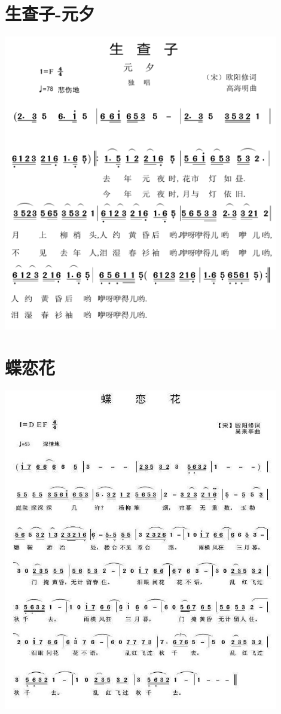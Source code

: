 \documentclass[cn,pad,twocol]{elegantbook}
\begin{document}
\section{生查子-元夕} \includegraphics[width=0.9\textwidth]{rpi400/20210212欧阳修-生查子元夕.png}
\section{蝶恋花} \includegraphics[width=0.9\textwidth]{rpi400/20210212欧阳修-蝶恋花.jpg}
\end{document}
